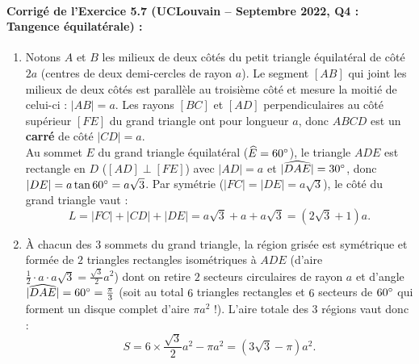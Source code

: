 \paragraph{Corrigé de l'Exercice 5.7 (UCLouvain -- Septembre 2022, Q4 : Tangence équilatérale) :}
\begin{enumerate}[label=(\alph*)]
    \item Notons $A$ et $B$ les milieux de deux côtés du petit triangle équilatéral de côté $2a$ (centres de deux demi-cercles de rayon $a$). Le segment $[AB]$ qui joint les milieux de deux côtés est parallèle au troisième côté et mesure la moitié de celui-ci : $|AB| = a$. Les rayons $[BC]$ et $[AD]$ perpendiculaires au côté supérieur $[FE]$ du grand triangle ont pour longueur $a$, donc $ABCD$ est un \textbf{carré} de côté $|CD| = a$.\\
    Au sommet $E$ du grand triangle équilatéral ($\widehat{E} = 60\degree$), le triangle $ADE$ est rectangle en $D$ ($[AD] \perp [FE]$) avec $|AD| = a$ et $|\widehat{DAE}| = 30\degree$, donc $|DE| = a\tan 60\degree = a\sqrt{3}$. Par symétrie ($|FC| = |DE| = a\sqrt{3}$), le côté du grand triangle vaut :
    \[
        L = |FC| + |CD| + |DE| = a\sqrt{3} + a + a\sqrt{3} = \boxed{(2\sqrt{3} + 1)a}.
    \]
    \item À chacun des $3$ sommets du grand triangle, la région grisée est symétrique et formée de $2$ triangles rectangles isométriques à $ADE$ (d'aire $\frac{1}{2}\cdot a \cdot a\sqrt{3} = \frac{\sqrt{3}}{2}a^2$) dont on retire $2$ secteurs circulaires de rayon $a$ et d'angle $|\widehat{DAE}| = 60\degree = \frac{\pi}{3}$ (soit au total $6$ triangles rectangles et $6$ secteurs de $60\degree$ qui forment un disque complet d'aire $\pi a^2$ !). L'aire totale des $3$ régions vaut donc :
    \[
        S = 6 \times \frac{\sqrt{3}}{2}a^2 - \pi a^2 = \boxed{(3\sqrt{3} - \pi)a^2}.
    \]
\end{enumerate}

